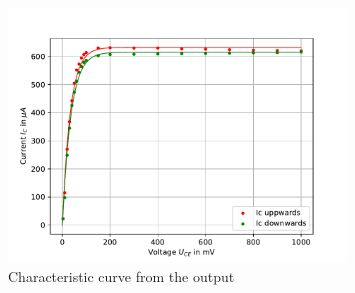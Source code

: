\documentclass[11pt, a4paper]{article}
\begin{document}
\begin{figure}[h]
    \centering
    \includegraphics[width=0.8\textwidth]{plots/Ausgangskennlinie.pdf}
    \caption{Characteristic curve from the output}
    \label{fig:Outcur}
\end{figure}







\end{document}
